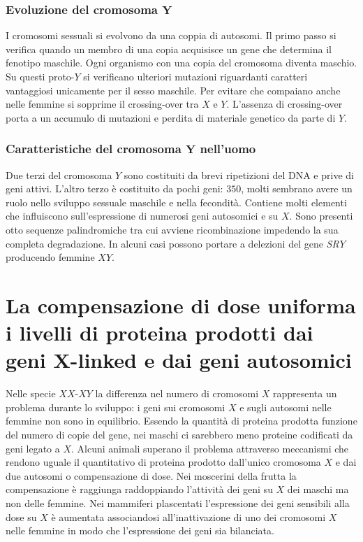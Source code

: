 		\subsubsection{Evoluzione del cromosoma $\mathbf{Y}$}
		I cromosomi sessuali si evolvono da una coppia di autosomi.
		Il primo passo si verifica quando un membro di una copia acquisisce un gene che determina il fenotipo maschile.
		Ogni organismo con una copia del cromosoma diventa maschio.
		Su questi proto-$Y$ si verificano ulteriori mutazioni riguardanti caratteri vantaggiosi unicamente per il sesso maschile.
		Per evitare che compaiano anche nelle femmine si sopprime il crossing-over tra $X$ e $Y$.
		L'assenza di crossing-over porta a un accumulo di mutazioni e perdita di materiale genetico da parte di $Y$.

		\subsubsection{Caratteristiche del cromosoma $\mathbf{Y}$ nell'uomo}
		Due terzi del cromosoma $Y$ sono costituiti da brevi ripetizioni del DNA e prive di geni attivi.
		L'altro terzo \`e costituito da pochi geni: $350$, molti sembrano avere un ruolo nello sviluppo sessuale maschile e nella fecondit\`a.
		Contiene molti elementi che influiscono sull'espressione di numerosi geni autosomici e su $X$.
		Sono presenti otto sequenze palindromiche tra cui avviene ricombinazione impedendo la sua completa degradazione.
		In alcuni casi possono portare a delezioni del gene \emph{SRY} producendo femmine $XY$.

\section{La compensazione di dose uniforma i livelli di proteina prodotti dai geni $\mathbf{X}$-linked e dai geni autosomici}
Nelle specie $XX$-$XY$ la differenza nel numero di cromosomi $X$ rappresenta un problema durante lo sviluppo: i geni sui cromosomi $X$ e sugli autosomi nelle femmine non sono in equilibrio.
Essendo la quantit\`a di proteina prodotta funzione del numero di copie del gene, nei maschi ci sarebbero meno proteine codificati da geni legato a $X$.
Alcuni animali superano il problema attraverso meccanismi che rendono uguale il quantitativo di proteina prodotto dall'unico cromosoma $X$ e dai due autosomi o compensazione di dose.
Nei moscerini della frutta la compensazione \`e raggiunga raddoppiando l'attivit\`a dei geni su $X$ dei maschi ma non delle femmine.
Nei mammiferi plascentati l'espressione dei geni sensibili alla dose su $X$ \`e aumentata associandosi all'inattivazione di uno dei cromosomi $X$ nelle femmine in modo che l'espressione dei geni sia bilanciata.

